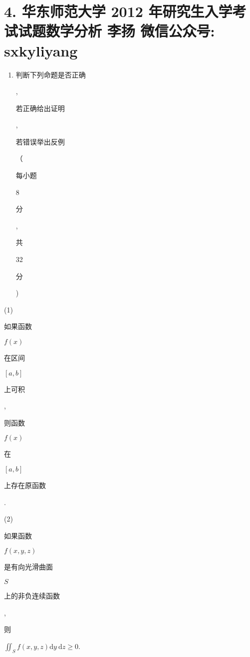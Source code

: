 \documentclass[10pt]{article}
\begin{document}
\section{4. 华东师范大学 2012 年研究生入学考试试题数学分析 
 李扬 
 微信公众号: sxkyliyang}
\begin{enumerate}
  \item \begin{CJK}{UTF8}{mj}判断下列命题是否正确\end{CJK}, \begin{CJK}{UTF8}{mj}若正确给出证明\end{CJK}, \begin{CJK}{UTF8}{mj}若错误举出反例\end{CJK}（\begin{CJK}{UTF8}{mj}每小题\end{CJK} 8 \begin{CJK}{UTF8}{mj}分\end{CJK}, \begin{CJK}{UTF8}{mj}共\end{CJK} 32 \begin{CJK}{UTF8}{mj}分\end{CJK})
\end{enumerate}
(1) \begin{CJK}{UTF8}{mj}如果函数\end{CJK} $f(x)$ \begin{CJK}{UTF8}{mj}在区间\end{CJK} $[a, b]$ \begin{CJK}{UTF8}{mj}上可积\end{CJK}, \begin{CJK}{UTF8}{mj}则函数\end{CJK} $f(x)$ \begin{CJK}{UTF8}{mj}在\end{CJK} $[a, b]$ \begin{CJK}{UTF8}{mj}上存在原函数\end{CJK}.

(2) \begin{CJK}{UTF8}{mj}如果函数\end{CJK} $f(x, y, z)$ \begin{CJK}{UTF8}{mj}是有向光滑曲面\end{CJK} $S$ \begin{CJK}{UTF8}{mj}上的非负连续函数\end{CJK}, \begin{CJK}{UTF8}{mj}则\end{CJK} $\iint_{S} f(x, y, z) \mathrm{d} y \mathrm{~d} z \geq 0$.
\end{document}
